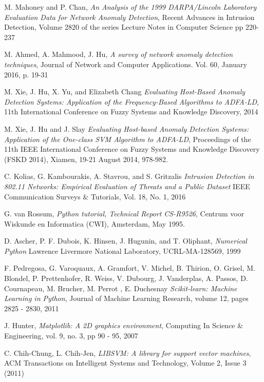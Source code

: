 \documentclass[reqno,openany,12pt]{amsbook}
\begin{document}
\begin{thebibliography}{99}
 M. Mahoney and P. Chan, \emph{An Analysis of the 1999 DARPA/Lincoln Laboratory Evaluation Data for Network Anomaly Detection}, Recent Advances in Intrusion Detection,  Volume 2820 of the series Lecture Notes in Computer Science pp 220-237

 M. Ahmed, A. Mahmood, J. Hu, \emph{A survey of network anomaly detection techniques}, Journal of Network and Computer Applications. Vol. 60, January 2016, p. 19-31

 M. Xie, J. Hu, X. Yu, and Elizabeth Chang \emph{Evaluating Host-Based Anomaly Detection Systems: Application of the Frequency-Based Algorithms to ADFA-LD}, 11th International Conference on Fuzzy Systems and Knowledge Discovery, 2014

 M. Xie, J. Hu and J. Slay \emph{Evaluating Host-based Anomaly Detection Systems:
Application of the One-class SVM Algorithm to ADFA-LD}, Proceedings of the 11th IEEE International Conference on Fuzzy Systems and Knowledge Discovery (FSKD 2014), Xiamen, 19-21 August 2014, 978-982. 

 C. Kolias, G. Kambourakis, A. Stavrou, and S. Gritzalis \emph{Intrusion Detection in 802.11 Networks: Empirical Evaluation of Threats and a Public Dataset} IEEE Communication Surveys \& Tutorials, Vol. 18, No. 1, 2016

 G. van Rossum, \emph{Python tutorial, Technical Report CS-R9526}, Centrum voor Wiskunde en Informatica (CWI), Amsterdam, May 1995.

 D. Ascher, P. F. Dubois, K. Hinsen, J. Hugunin, and T. Oliphant,
\emph{Numerical Python} Lawrence Livermore National Laboratory, UCRL-MA-128569, 1999

 F. Pedregosa, G. Varoquaux, A. Gramfort, V. Michel, B. Thirion, O. Grisel, M. Blondel, P. Prettenhofer, R. Weiss, V. Dubourg, J. Vanderplas, A. Passos, D. Cournapeau, M. Brucher, M. Perrot , E. Duchesnay 
\emph{Scikit-learn: Machine Learning in Python}, Journal of Machine Learning Research, volume 12,
 pages 2825 - 2830, 2011

J. Hunter, \emph{Matplotlib: A 2D graphics environment}, Computing In Science \& Engineering, vol. 9, no. 3, pp 90 - 95, 2007

 C. Chih-Chung, L. Chih-Jen, \emph{LIBSVM: A library for support vector machines}, ACM Transactions on Intelligent Systems and Technology, Volume 2, Issue 3 (2011)


\end{thebibliography}
\end{document}
